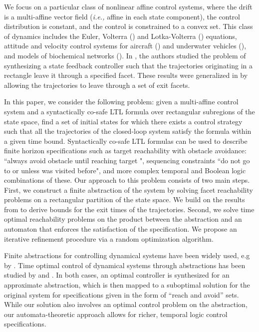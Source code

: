 \documentclass{ifacconf}
\begin{document}
We focus on a particular class of nonlinear affine
control systems, where the drift
is a multi-affine vector field ({\em i.e.,} affine in each state
component), the control distribution is constant, and the
control is constrained to a convex set. This class of
dynamics includes the
Euler, Volterra (\cite{Volterra1926}) and Lotka-Volterra
(\cite{Lotka1925}) equations, attitude and velocity control systems
for aircraft (\cite{vanderSchaft}) and underwater vehicles
(\cite{Belta-ICRA2004}), and models
of biochemical networks (\cite{jong2002}). 
In \cite{Belta-TAC06}, the authors studied the problem of synthesizing a state feedback controller such that the trajectories originating in a rectangle leave it through a specified facet. These results were generalized in \cite{Habets2006} by allowing the trajectories to leave through a set of exit facets. 

In this paper, we consider the following problem: given a multi-affine control system and a syntactically co-safe LTL formula over rectangular subregions of the state space, find a set of initial states for which there exists a control strategy such that all the trajectories of the closed-loop system satisfy the formula within a given time bound. Syntactically co-safe LTL formulas can be used to describe finite horizon specifications such as target reachability with obstacle avoidance: ``always avoid obstacle  until reaching target ", sequencing constraints ``do not go to  or  unless  was visited before", and more complex temporal and Boolean logic combinations of these. Our approach to this problem consists of two main steps. First, we construct a finite abstraction of the system by solving facet reachability problems on a rectangular partition of the state space. We build on the results from \cite{Belta-TAC06,Habets2006} to derive bounds for the exit times of the trajectories. 
Second, we solve time optimal reachability problems on the product between the abstraction and an automaton that enforces the satisfaction of the specification. 
We propose an iterative refinement procedure via a random optimization algorithm.

Finite abstractions for controlling dynamical systems have been widely used, e.g by \cite{TP03}. 
Time optimal control of dynamical systems through abstractions has been studied by \cite{Mazo:2011} and \cite{Girard:2010Opt}. In both cases, an optimal controller is synthesized for an approximate abstraction, which is then mapped to a suboptimal solution for the original system for specifications given in the form of ``reach and avoid'' sets. While our solution also involves an optimal control problem on the abstraction, our automata-theoretic approach allows for richer, temporal logic 
control specifications.
\end{document}

